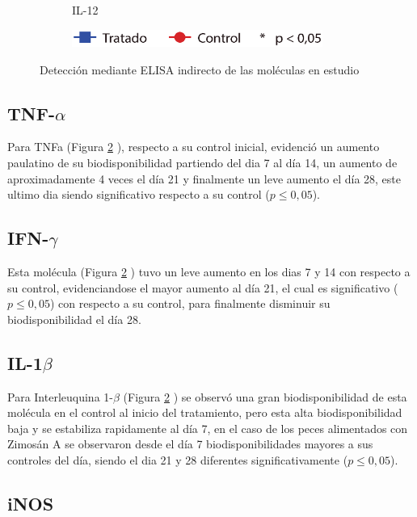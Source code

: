 \documentclass[12pt,letterpaper,oneside]{scrbook}
\begin{document}
\begin{figure}[h]
\begin{subfigure}{0.5\textwidth}
        \caption{IL-12}
        \label{fig:elisa:il12}
    \end{subfigure}
    \begin{subfigure}{0.5\textwidth}
        \includegraphics[width=0.9\textwidth]{eps/qPCR/leyenda}
    \end{subfigure}
    \caption{Detección mediante ELISA indirecto de las moléculas en estudio}
    \label{fig:elisa}
\end{figure}

\subsection{TNF-$\alpha$}

Para TNFa (Figura \ref{fig:elisa} ), respecto a
su control inicial, evidenció un aumento paulatino de su
biodisponibilidad partiendo del dia 7 al día 14, un aumento de
aproximadamente 4 veces el día 21 y finalmente un leve aumento el día
28, este ultimo dia siendo significativo respecto a su control
(\(p \leq 0,05\)).

\subsection{IFN-$\gamma$}

Esta molécula (Figura \ref{fig:elisa} ) tuvo un
leve aumento en los dias 7 y 14 con respecto a su control,
evidenciandose el mayor aumento al día 21, el cual es significativo
(\(p \leq 0,05\)) con respecto a su control, para finalmente disminuir
su biodisponibilidad el día 28.

\subsection{IL-1$\beta$}

Para Interleuquina 1-\(\beta\) (Figura \ref{fig:elisa}
) se observó una gran biodisponibilidad de esta
molécula en el control al inicio del tratamiento, pero esta alta
biodisponibilidad baja y se estabiliza rapidamente al día 7, en el caso
de los peces alimentados con Zimosán A se observaron desde el día 7
biodisponibilidades mayores a sus controles del día, siendo el dia 21 y
28 diferentes significativamente (\(p \leq 0,05\)).

\subsection{iNOS}
\end{document}
